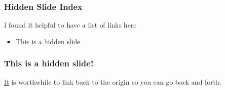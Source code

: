 \documentclass{beamer}
\begin{document}
\begin{frame}
\end{frame}
\begin{frame}
  \frametitle{Hidden Slide Index}
  I found it helpful to have a list of links here
  \begin{itemize}
  \item \hyperlink{hiddenslide1}{This is a hidden slide}
  \end{itemize}
\end{frame}
\begin{frame}[label=hiddenslide1]

  \frametitle{This is a hidden slide!}
  \hyperlink{hiddenslide1-origin}{It} is worthwhile
  to link back to the origin so you can go back and forth. 
\end{frame}
\end{document}
